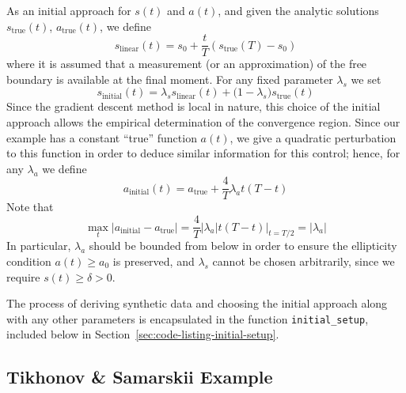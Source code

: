 \documentclass[letterpaper, 10pt, draft]{amsart}
\theoremstyle{definition}
\theoremstyle{remark}
\begin{document}
As an initial approach for $s(t)$ and $a(t)$, and given the analytic solutions
$s_{\text{true}}(t)$, $a_{\text{true}}(t)$, we define
\begin{equation}
  s_{\text{linear}}(t) = s_0 + \frac{t}{T}\left(s_{\text{true}}(T) - s_0\right)
\end{equation}
where it is assumed that a measurement (or an approximation) of the
free boundary is available at the final moment.
For any fixed parameter $\lambda_s$ we set
\begin{equation}
  s_{\text{initial}}(t) = \lambda_s s_{\text{linear}}(t) + \big(1-\lambda_s\big)s_{\text{true}}(t)
\end{equation}
Since the gradient descent method is local in nature, this choice of the initial
approach allows the empirical determination of the convergence region.
Since our example has a constant ``true'' function $a(t)$, we give a quadratic
perturbation to this function in order to deduce similar information for this
control; hence, for any $\lambda_a$ we define
\begin{equation}
  a_{\text{initial}}(t) = a_{\text{true}}
  + \frac{4}{T}\lambda_a t (T-t)
\end{equation}
Note that
\[
  \max_t \vert a_{\text{initial}} - a_{\text{true}} \vert
  = \frac{4}{T} \vert \lambda_a \vert t (T-t) \vert_{t=T/2}
  = \vert \lambda_a \vert
\]
In particular, $\lambda_a$ should be bounded from below in order to ensure the
ellipticity condition $a(t) \geq a_0$ is preserved, and $\lambda_s$ cannot be
chosen arbitrarily, since we require $s(t) \geq \delta > 0$.

The process of deriving synthetic data and choosing the initial approach along
with any other parameters is encapsulated in the function \verb+initial_setup+,
included below in Section~\ref{sec:code-listing-initial-setup}.

\subsection{Tikhonov \& Samarskii Example}
\end{document}

